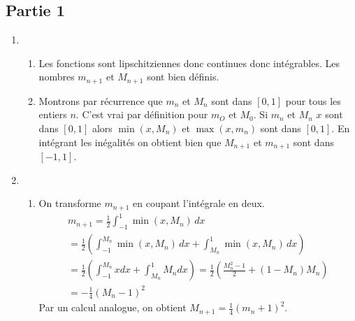 \subsection*{Partie 1}
\begin{enumerate}
 \item \begin{enumerate}
 \item Les fonctions sont lipschitziennes donc continues donc intégrables. Les nombres $m_{n+1}$ et $M_{n+1}$ sont bien définis.
\item Montrons par récurrence que $m_n$ et $M_n$ sont dans $[0,1]$ pour tous les entiers $n$. C'est vrai par définition pour $m_O$ et $M_0$. Si $m_n$ et $M_n$ $x$ sont dans $[0,1]$ alors $\min(x,M_n)$ et $\max(x,m_n)$ sont dans $[0,1]$. En intégrant les inégalités on obtient bien que $M_{n+1}$ et $m_{n+1}$ sont dans $[-1,1]$.
\end{enumerate}
\item \begin{enumerate}
 \item On transforme $m_{n+1}$ en coupant l'intégrale en deux.
\begin{multline*}
 m_{n+1}= \frac{1}{2}\int_{-1}^{1}\min (x,M_n)\,dx \\
= \frac{1}{2}\left( \int_{-1}^{M_n}\min (x,M_n)\,dx + \int_{M_n}^{1}\min (x,M_n)\,dx\right)\\
= \frac{1}{2}\left( \int_{-1}^{M_n}xdx + \int_{M_n}^{1}M_ndx\right)
=\frac{1}{2}\left( \frac{M_n^2 -1}{2} + (1-M_n)M_n \right)\\
= -\frac{1}{4}(M_n -1)^2 
\end{multline*}
Par un calcul analogue, on obtient $M_{n+1}=\frac{1}{4}(m_n +1)^2$.


\end{enumerate}
\end{enumerate}
